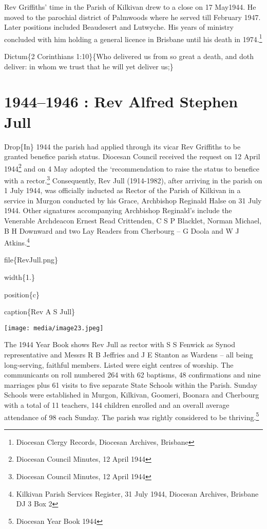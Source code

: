 Rev Griffiths' time in the Parish of Kilkivan drew to a close on 17 May1944. He moved to the parochial district of Palmwoods where he served till February 1947. Later positions included Beaudesert and Lutwyche. His years of ministry concluded with him holding a general licence in Brisbane until his death in 1974.\footnote{Diocesan Clergy Records, Diocesan Archives, Brisbane}

Dictum\{2 Corinthians 1:10\}\{Who delivered us from so great a death, and doth deliver: in whom we trust that he will yet deliver us;\}

\hypertarget{rev-alfred-stephen-jull}{%
\chapter{1944--1946 : Rev Alfred Stephen Jull}\label{rev-alfred-stephen-jull}}

Drop\{In\} 1944 the parish had applied through its vicar Rev Griffiths to be granted benefice parish status. Diocesan Council received the request on 12 April 1944\footnote{Diocesan Council Minutes, 12 April 1944} and on 4 May adopted the `recommendation to raise the status to benefice with a rector.\footnote{Diocesan Council Minutes, 12 April 1944} Consequently, Rev Jull (1914-1982), after arriving in the parish on 1 July 1944, was officially inducted as Rector of the Parish of Kilkivan in a service in Murgon conducted by his Grace, Archbishop Reginald Halse on 31 July 1944. Other signatures accompanying Archbishop Reginald's include the Venerable Archdeacon Ernest Read Crittenden, C S P Blacklet, Norman Michael, B H Downward and two Lay Readers from Cherbourg -- G Doola and W J Atkins.\footnote{Kilkivan Parish Services Register, 31 July 1944, Diocesan Archives, Brisbane DJ 3 Box 2}

file\{RevJull.png\}

width\{1.\}

position\{c\}

caption\{Rev A S Jull\}

\texttt{[image: media/image23.jpeg]}

The 1944 Year Book shows Rev Jull as rector with S S Fenwick as Synod representative and Messrs R B Jeffries and J E Stanton as Wardens -- all being long-serving, faithful members. Listed were eight centres of worship. The communicants on roll numbered 264 with 62 baptisms, 48 confirmations and nine marriages plus 61 visits to five separate State Schools within the Parish. Sunday Schools were established in Murgon, Kilkivan, Goomeri, Boonara and Cherbourg with a total of 11 teachers, 144 children enrolled and an overall average attendance of 98 each Sunday. The parish was rightly considered to be thriving.\footnote{Diocesan Year Book 1944}

